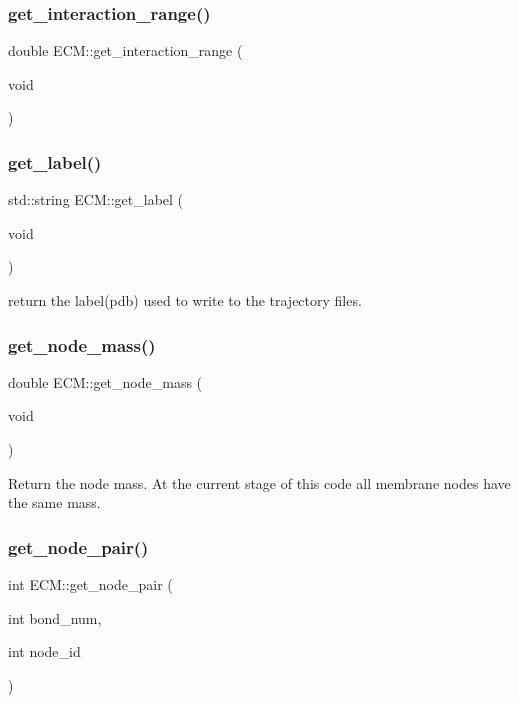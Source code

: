 \subsubsection{\texorpdfstring{get\_interaction\_range()}{get\_interaction\_range()}}
{\footnotesize\ttfamily double E\+C\+M\+::get\+\_\+interaction\+\_\+range (\begin{DoxyParamCaption}\item[{void}]{ }\end{DoxyParamCaption})\hspace{0.3cm}{\ttfamily [inline]}}

\mbox{\label{classECM_a2979fbe785c15c43932ba9f6590fd4ef}} 
\subsubsection{\texorpdfstring{get\_label()}{get\_label()}}
{\footnotesize\ttfamily std\+::string E\+C\+M\+::get\+\_\+label (\begin{DoxyParamCaption}\item[{void}]{ }\end{DoxyParamCaption})\hspace{0.3cm}{\ttfamily [inline]}}

return the label(pdb) used to write to the trajectory files. \mbox{\label{classECM_a5ae07f6f6a367dc6ebac42387ad8edd2}} 
\subsubsection{\texorpdfstring{get\_node\_mass()}{get\_node\_mass()}}
{\footnotesize\ttfamily double E\+C\+M\+::get\+\_\+node\+\_\+mass (\begin{DoxyParamCaption}\item[{void}]{ }\end{DoxyParamCaption})\hspace{0.3cm}{\ttfamily [inline]}}

Return the node mass. At the current stage of this code all membrane nodes have the same mass. \mbox{\label{classECM_a97b1c4fbfa1158752369ed3e1c8f2f59}} 
\subsubsection{\texorpdfstring{get\_node\_pair()}{get\_node\_pair()}}
{\footnotesize\ttfamily int E\+C\+M\+::get\+\_\+node\+\_\+pair (\begin{DoxyParamCaption}\item[{int}]{bond\+\_\+num,  }\item[{int}]{node\+\_\+id }\end{DoxyParamCaption})\hspace{0.3cm}{\ttfamily [inline]}}

